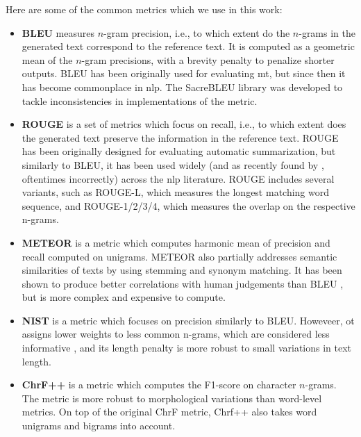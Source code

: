 {Here are some of the common metrics which we use in this work:

\begin{itemize}
  \item \textbf{BLEU} \cite{papineni2002bleu} measures $n$-gram precision, i.e., to which extent do the $n$-grams in the generated text correspond to the reference text.  It is computed as a geometric mean of the $n$-gram precisions, with a brevity penalty to penalize shorter outputs. BLEU has been originally used for evaluating \ac{mt}, but since then it has become commonplace in \ac{nlp}. The SacreBLEU library \cite{post2018call}  was developed to tackle inconsistencies in implementations of the metric.
  \item \textbf{ROUGE} \cite{lin-2004-rouge} is a set of metrics which focus on recall, i.e., to which extent does the generated text preserve the information in the reference text. ROUGE has been originally designed for evaluating automatic summarization, but similarly to BLEU, it has been used widely (and as recently found by \citet{gruskyRogueScores2023}, oftentimes incorrectly) across the \ac{nlp} literature. ROUGE includes several variants, such as ROUGE-L, which measures the longest matching word sequence, and ROUGE-{1/2/3/4}, which measures the overlap on the respective n-grams.
  \item \textbf{METEOR} \cite{banerjee-lavie-2005-meteor} is a metric which computes harmonic mean of precision and recall computed on unigrams. METEOR also partially addresses semantic similarities of texts by using stemming and synonym matching. It has been shown to produce better correlations with human judgements than BLEU \cite{agarwal2008meteor}, but is more complex and expensive to compute.
  \item \textbf{NIST} \cite{martin2000nist} is a metric which focuses on precision similarly to BLEU. Howeveer, ot assigns lower weights to less common n-grams, which are considered less informative \cite{doddington2002automatic}, and its length penalty is more robust to small variations in text length.
  \item \textbf{ChrF++} \cite{popovic2015chrf,popovic2017chrf} is a metric which computes the F1-score on character $n$-grams. The metric is more robust to morphological variations than word-level metrics. On top of the original ChrF metric, Chrf++ also takes word unigrams and bigrams into account.
\end{itemize}
}

